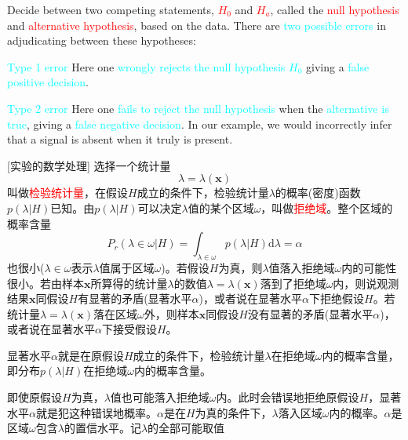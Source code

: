 \documentclass[12pt,a4paper]{article}
\renewcommand{\vec}[1]{\boldsymbol{#1}}
\newcommand{\dif}{\mathrm{d}}
\begin{document}
Decide between two competing statements, \textcolor{red}{$H_0$} and \textcolor{red}{$H_a$}, called the \textcolor{red}{null hypothesis} and \textcolor{red}{alternative hypothesis}, based on the data. There are \textcolor{cyan}{two possible errors} in adjudicating between these hypotheses: 

\textcolor{cyan}{Type 1 error} Here one \textcolor{cyan}{wrongly rejects the null hypothesis $H_0$} giving a \textcolor{cyan}{false positive decision}.

\textcolor{cyan}{Type 2 error} Here one \textcolor{cyan}{fails to reject the null hypothesis} when the \textcolor{cyan}{alternative is true}, giving a \textcolor{cyan}{false negative decision}. In our example, we would incorrectly infer that a signal is absent when it truly is present.

[实验的数学处理] 选择一个统计量
\begin{equation}
\lambda = \lambda(\vec{x})
\end{equation}
叫做\textcolor{red}{检验统计量}，在假设$H$成立的条件下，检验统计量$\lambda$的概率(密度)函数$p(\lambda | H)$已知。由$p(\lambda | H)$可以决定$\lambda$值的某个区域$\omega$，叫做\textcolor{red}{拒绝域}。整个区域的概率含量
\begin{equation}
P_r(\lambda \in \omega | H) = \int_{\lambda \in \omega} p(\lambda | H) \dif \lambda = \alpha 
\end{equation}
也很小($\lambda \in \omega$表示$\lambda$值属于区域$\omega$)。若假设$H$为真，则$\lambda$值落入拒绝域$\omega$内的可能性很小。若由样本$\vec{x}$所算得的统计量$\lambda$的数值$\lambda = \lambda(\vec{x})$落到了拒绝域$\omega$内，则说观测结果$\vec{x}$同假设$H$有显著的矛盾(显著水平$\alpha$)，或者说在显著水平$\alpha$下拒绝假设$H$。若统计量$\lambda = \lambda(\vec{x})$落在区域$\omega$外，则样本$\vec{x}$同假设$H$没有显著的矛盾(显著水平$\alpha$)，或者说在显著水平$\alpha$下接受假设$H$。

显著水平$\alpha$就是在原假设$H$成立的条件下，检验统计量$\lambda$在拒绝域$\omega$内的概率含量，即分布$p(\lambda | H)$在拒绝域$\omega$内的概率含量。








即使原假设$H$为真，$\lambda$值也可能落入拒绝域$\omega$内。此时会错误地拒绝原假设$H$，显著水平$\alpha$就是犯这种错误地概率。$\alpha$是在$H$为真的条件下，$\lambda$落入区域$\omega$内的概率。$\alpha$是区域$\omega$包含$\lambda$的置信水平。记$\lambda$的全部可能取值
\end{document}

